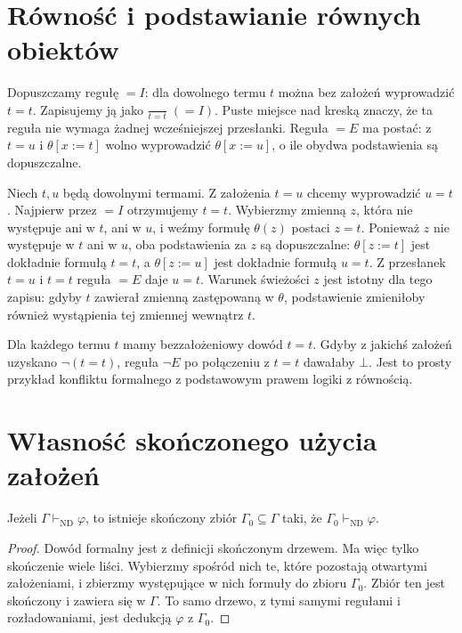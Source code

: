 \section{Równość i podstawianie równych obiektów}
\begin{definicja}\label{def:nd-equality}
Dopuszczamy regułę $=I$: dla dowolnego termu $t$
można bez założeń wyprowadzić $t=t$. Zapisujemy ją jako
$\frac{}{t=t}\;(=I)$. Puste miejsce nad kreską znaczy,
że ta reguła nie wymaga żadnej wcześniejszej przesłanki.
Reguła $=E$ ma postać: z $t=u$ i
$\theta[x:=t]$ wolno wyprowadzić $\theta[x:=u]$,
o ile obydwa podstawienia są dopuszczalne.
\end{definicja}
\begin{przyklad}
Niech $t,u$ będą dowolnymi termami. Z założenia $t=u$
chcemy wyprowadzić $u=t$.
Najpierw przez $=I$ otrzymujemy $t=t$.
Wybierzmy zmienną $z$, która nie występuje ani w $t$,
ani w $u$, i weźmy formułę $\theta(z)$ postaci $z=t$.
Ponieważ $z$ nie występuje w $t$ ani w $u$, oba podstawienia
za $z$ są dopuszczalne:
$\theta[z:=t]$ jest dokładnie formułą $t=t$,
a $\theta[z:=u]$ jest dokładnie formułą $u=t$.
Z przesłanek $t=u$ i $t=t$ reguła $=E$ daje $u=t$.
Warunek świeżości $z$ jest istotny dla tego zapisu:
gdyby $t$ zawierał zmienną zastępowaną w $\theta$,
podstawienie zmieniłoby również wystąpienia tej
zmiennej wewnątrz $t$.
\end{przyklad}
\begin{przyklad}
Dla każdego termu $t$ mamy bezzałożeniowy dowód $t=t$.
Gdyby z jakichś założeń uzyskano $\neg(t=t)$,
reguła $\neg E$ po połączeniu z $t=t$ dawałaby $\bot$.
Jest to prosty przykład konfliktu formalnego z podstawowym
prawem logiki z równością.
\end{przyklad}

\section{Własność skończonego użycia założeń}
\begin{twierdzenie}
\label{thm:nd-finite-support}
Jeżeli $\Gamma\vdash_{\mathrm{ND}}\varphi$, to istnieje
skończony zbiór $\Gamma_0\subseteq\Gamma$ taki, że
$\Gamma_0\vdash_{\mathrm{ND}}\varphi$.
\end{twierdzenie}
\begin{proof}
Dowód formalny jest z definicji skończonym drzewem.
Ma więc tylko skończenie wiele liści. Wybierzmy spośród
nich te, które pozostają otwartymi założeniami, i zbierzmy
występujące w nich formuły do zbioru $\Gamma_0$.
Zbiór ten jest skończony i zawiera się w $\Gamma$.
To samo drzewo, z tymi samymi regułami i rozładowaniami,
jest dedukcją $\varphi$ z $\Gamma_0$.
\end{proof}

